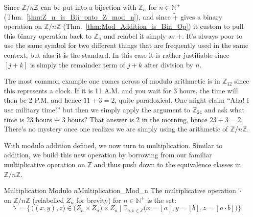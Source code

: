 \documentclass{article}                                                        %
\begin{document}
            Since $\mathbb{Z}/n\mathbb{Z}$ can be put into a bijection with
            $\mathbb{Z}_{n}$ for $n\in\mathbb{N}^{+}$
            (Thm.~\ref{thm:Z_n_is_Bij_onto_Z_mod_n}), and since $\tilde{+}$
            gives a binary operation on $\mathbb{Z}/n\mathbb{Z}$
            (Thm.~\ref{thm:Mod_Addition_is_Bin_Op}) it custom to pull this
            binary operation back to $\mathbb{Z}_{n}$ and relabel it simply as
            $+$. It's always poor to use the same symbol for two different
            things that are frequently used in the same context, but alas it is
            the standard. In this case it is rather justifiable since
            $[j+k]$ is simply the remainder term of $j+k$ after division by $n$.
            \begin{example}
                The most common example one comes across of modulo arithmetic is
                in $\mathbb{Z}_{12}$ since this represents a clock. If it is 11
                A.M. and you wait for 3 hours, the time will then be 2 P.M. and
                hence $11+3=2$, quite paradoxical. One might claim ``Aha! I use
                military time!'' but then we simply apply the argument to
                $\mathbb{Z}_{24}$ and ask what time is 23 hours + 3 hours? That
                answer is 2 in the morning, hence $23+3=2$. There's no mystery
                once one realizes we are simply using the arithmetic of
                $\mathbb{Z}/n\mathbb{Z}$.
            \end{example}
            With modulo addition defined, we now turn to multiplication. Similar
            to addition, we build this new operation by borrowing from our
            familiar multiplicative operation on $\mathbb{Z}$ and thus push
            down to the equivalence classes in $\mathbb{Z}/n\mathbb{Z}$.
            \begin{fdefinition}{Multiplication Modulo $n$}{Multiplication_Mod_n}
                The multiplicative operation $\tilde{\cdot}$ on
                $\mathbb{Z}/n\mathbb{Z}$
                (relabelled $Z_{n}$ for brevity) for $n\in\mathbb{N}^{+}$
                is the set:
                \begin{equation*}
                    \tilde{\cdot}=\big\{\,\big((x,y),z\big)
                        \in\big(Z_{n}\times{Z}_{n}\big)\times{Z}_{n}\;\big|\;
                        \exists_{a,b\in\mathbb{Z}}
                        \big(x=[a],y=[b],z=[a\cdot{b}]\big)\big\}
                \end{equation*}
            \end{fdefinition}
\end{document}
